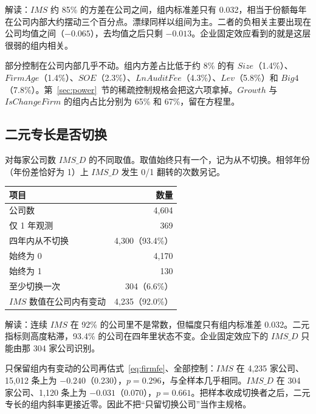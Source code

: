 \documentclass[11pt]{article}
\begin{document}
解读：\(IMS\) 约 85\% 的方差在公司之间，组内标准差只有 0.032，相当于份额每年在公司内部大约摆动三个百分点。漂绿同样以组间为主。二者的负相关主要出现在公司均值之间（\(-0.065\)），去均值之后只剩 \(-0.013\)。企业固定效应看到的就是这层很弱的组内相关。

部分控制在公司内部几乎不动。组内方差占比低于约 8\% 的有 \(Size\)（1.4\%）、\(FirmAge\)（1.4\%）、\(SOE\)（2.3\%）、\(LnAuditFee\)（4.3\%）、\(Lev\)（5.8\%）和 \(Big4\)（7.8\%）。第~\ref{sec:power}~节的稀疏控制规格会把这六项拿掉。\(Growth\) 与 \(IsChangeFirm\) 的组内占比分别为 65\% 和 67\%，留在方程里。

\subsection{二元专长是否切换}

对每家公司数 \(IMS\_D\) 的不同取值。取值始终只有一个，记为从不切换。相邻年份（年份差恰好为 1）上 \(IMS\_D\) 发生 0/1 翻转的次数另记。

\begin{center}
\begin{threeparttable}
\caption{\(IMS\_D\) 的公司内切换}
\label{tab:switch}
\begin{tabular}{lr}
\toprule
项目 & 数量 \\
\midrule
公司数 & 4,604 \\
仅 1 年观测 & 369 \\
四年内从不切换 & 4,300（93.4\%） \\
\quad 始终为 0 & 4,170 \\
\quad 始终为 1 & 130 \\
至少切换一次 & 304（6.6\%） \\
\(IMS\) 数值在公司内有变动 & 4,235（92.0\%） \\
\bottomrule
\end{tabular}
\end{threeparttable}
\end{center}

解读：连续 \(IMS\) 在 92\% 的公司里不是常数，但幅度只有组内标准差 0.032。二元指标则高度粘滞，93.4\% 的公司在四年里状态不变。企业固定效应下的 \(IMS\_D\) 只能由那 304 家公司识别。

只保留组内有变动的公司再估式~\eqref{eq:firmfe}、全部控制：\(IMS\) 在 4,235 家公司、15,012 条上为 \(-0.240\)（0.230），\(p=0.296\)，与全样本几乎相同。\(IMS\_D\) 在 304 家公司、1,120 条上为 \(-0.031\)（0.070），\(p=0.661\)。把样本收成切换者之后，二元专长的组内斜率更接近零。因此不把``只留切换公司''当作主规格。
\end{document}
